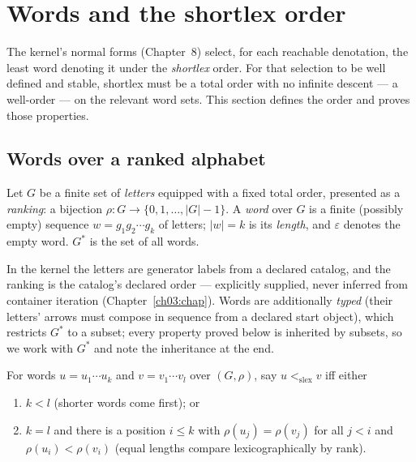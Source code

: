 \section{Words and the shortlex order}\label{ch02:sec:shortlex}

The kernel's normal forms (Chapter~8) select, for each reachable
denotation, the least word denoting it under the \emph{shortlex} order.
For that selection to be well defined and stable, shortlex must be a total
order with no infinite descent --- a well-order --- on the relevant word
sets. This section defines the order and proves those properties.

\subsection{Words over a ranked alphabet}

\begin{definition}[Words]\label{ch02:def:words}
Let $G$ be a finite set of \emph{letters} equipped with a fixed total
order, presented as a \emph{ranking}: a bijection
$\rho : G \to \{0, 1, \dots, |G| - 1\}$. A \emph{word} over $G$ is a
finite (possibly empty) sequence $w = g_{1} g_{2} \cdots g_{k}$ of
letters; $|w| = k$ is its \emph{length}, and $\varepsilon$ denotes the
empty word. $G^{*}$ is the set of all words.
\end{definition}

In the kernel the letters are generator labels from a declared catalog,
and the ranking is the catalog's declared order --- explicitly supplied,
never inferred from container iteration (Chapter~\ref{ch03:chap}). Words
are additionally \emph{typed} (their letters' arrows must compose in
sequence from a declared start object), which restricts $G^{*}$ to a
subset; every property proved below is inherited by subsets, so we work
with $G^{*}$ and note the inheritance at the end.

\begin{definition}[Shortlex]\label{ch02:def:shortlex}
For words $u = u_1 \cdots u_k$ and $v = v_1 \cdots v_l$ over $(G, \rho)$,
say $u <_{\mathrm{slex}} v$ iff either
\begin{enumerate}
\item $k < l$ (shorter words come first); or
\item $k = l$ and there is a position $i \leq k$ with
$\rho(u_j) = \rho(v_j)$ for all $j < i$ and $\rho(u_i) < \rho(v_i)$
(equal lengths compare lexicographically by rank).
\end{enumerate}
\end{definition}


